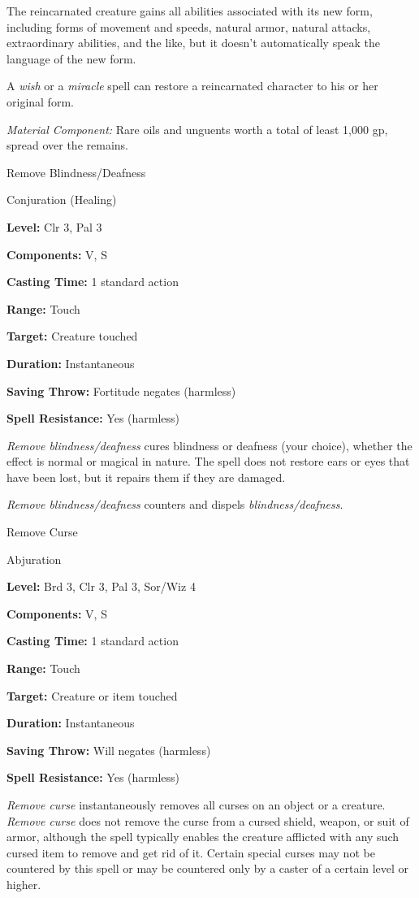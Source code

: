 \documentclass{article}
\begin{document}
The reincarnated creature gains all abilities associated with its new form, including 
forms of movement and speeds, natural armor, natural attacks, extraordinary abilities, 
and the like, but it doesn't automatically speak the language of the new form. 

A \textit{wish }or a \textit{miracle }spell can restore a reincarnated character 
to his or her original form.

\textit{Material Component: }Rare oils and unguents worth a total of least 1,000 
gp, spread over the remains.

\vspace{12pt}
Remove Blindness/Deafness

Conjuration (Healing)

\textbf{Level:} Clr 3, Pal 3

\textbf{Components:} V, S

\textbf{Casting Time:} 1 standard action

\textbf{Range:} Touch

\textbf{Target:} Creature touched

\textbf{Duration:} Instantaneous

\textbf{Saving Throw:} Fortitude negates (harmless)

\textbf{Spell Resistance:} Yes (harmless)

\textit{Remove blindness/deafness }cures blindness or deafness (your choice), whether 
the effect is normal or magical in nature. The spell does not restore ears or eyes 
that have been lost, but it repairs them if they are damaged.

\textit{Remove blindness/deafness }counters and dispels \textit{blindness/deafness}.

\vspace{12pt}
Remove Curse

Abjuration

\textbf{Level:} Brd 3, Clr 3, Pal 3, Sor/Wiz 4

\textbf{Components:} V, S

\textbf{Casting Time:} 1 standard action

\textbf{Range:} Touch

\textbf{Target:} Creature or item touched

\textbf{Duration:} Instantaneous

\textbf{Saving Throw: }Will negates (harmless)

\textbf{Spell Resistance:} Yes (harmless)

\textit{Remove curse }instantaneously removes all curses on an object or a creature. 
\textit{Remove curse }does not remove the curse from a cursed shield, weapon, or 
suit of armor, although the spell typically enables the creature afflicted with 
any such cursed item to remove and get rid of it. Certain special curses may not 
be countered by this spell or may be countered only by a caster of a certain level 
or higher.
\end{document}
